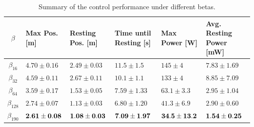 \documentclass[letterpaper, 10 pt, conference]{ieeeconf}
\begin{document}
\begin{table}[h!]
\centering
\caption{\label{tab:control_performance} Summary of the control performance
under different betas.}
\vspace{-\baselineskip}
\begin{tabular}{c|p{0.9cm}|p{1.0cm}|p{1.4cm}|p{1.0cm}|p{1.5cm}}
$\beta$ & Max Pos. [m] & Resting Pos. [m] & Time until Resting [s] & Max Power
[W] & Avg. Resting Power [mW] \\
\hline
\hline
$\beta_{16}$ &  $4.70 \pm 0.16$ & $2.49 \pm 0.03$ & $11.5 \pm 1.5$  &  $145 \pm
4$ & $7.83 \pm 1.69$\\
\hline
$\beta_{32}$ & $4.59 \pm 0.11$ & $2.67 \pm 0.11$ & $10.1 \pm 1.1$  &  $133 \pm
4$ & $8.85 \pm 7.09$\\
\hline
$\beta_{64}$ & $3.59 \pm 0.17$ & $1.53 \pm 0.05$ & $7.59 \pm 1.33$  &  $63.1 \pm
3.3$ & $2.95 \pm 1.04$\\
\hline
$\beta_{128}$ & $2.74 \pm 0.07$ & $1.13 \pm 0.03$ & $6.80 \pm 1.20$  &  $41.3
\pm 6.9$ & $2.90 \pm 0.60$\\
\hline
$\beta_{190}$ & $\bf 2.61 \pm 0.08$ & $\bf 1.08 \pm 0.03$ & $\bf 7.09 \pm 1.97$
& $\bf 34.5 \pm 13.2$ & $\bf 1.54 \pm 0.25$ \\
\end{tabular}
\end{table}

\end{document}
